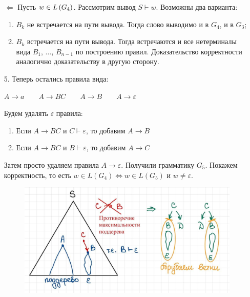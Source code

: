\begin{itemize}
$\Leftarrow$ Пусть $w \in L \left({G_4}\right)$. Рассмотрим вывод $S \vdash w$. Возможны два варианта:

\begin{enumerate}
    \item $B_k$ не встречается на пути вывода. Тогда слово выводимо и в $G_4$, и в $G_3$;
    \item $B_k$ встречается на пути вывода. Тогда встречаются и все нетерминалы вида $B_1$, $\dots$, $B_{n - 1}$ по построению правил. Доказательство корректности аналогично доказательству в другую сторону.
\end{enumerate}

    \item[5.] Теперь остались правила вида:
\begin{center}
    $A \rightarrow a \qquad A \rightarrow BC \qquad A \rightarrow B \qquad A \rightarrow \varepsilon$
\end{center}


Будем удалять $\varepsilon$ правила:
\begin{enumerate}
    \item Если $A \rightarrow BC$ и $C \vdash \varepsilon$, то добавим $A \rightarrow B$
    \item Если $A \rightarrow BC$ и $B \vdash \varepsilon$, то добавим $A \rightarrow C$
\end{enumerate}

Затем просто удаляем правила $A \rightarrow \varepsilon$. Получили грамматику $G_5$. Покажем корректность, то есть $w \in L(G_4) \Leftrightarrow w \in L(G_5)$ и $w \neq \varepsilon$.
\begin{figure}[h!]
        \centering
        \includegraphics[scale=0.43]{images/tree.jpg}
        \label{fig:first}
\end{figure}


\end{itemize}
